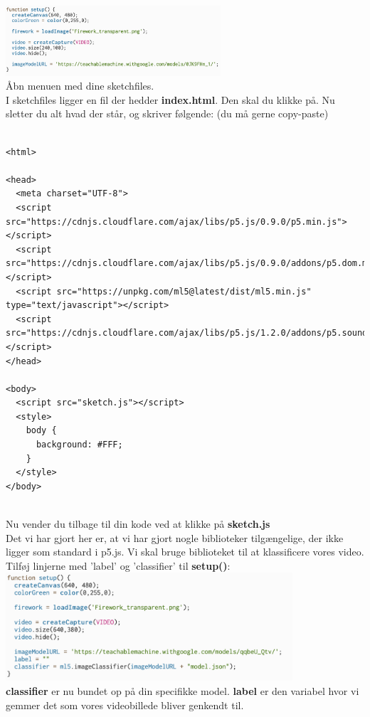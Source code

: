 \documentclass{ucph-handout}
\begin{document}
\newpage
\begin{exercisebox}

\includegraphics[width=0.6\textwidth]{nyebilleder/setupmodel.png}\\

Åbn menuen med dine sketchfiles.\\

I sketchfiles ligger en fil der hedder \textbf{index.html}. Den skal du klikke på. Nu sletter du alt hvad der står, og skriver følgende: (du må gerne copy-paste)

\begin{Verbatim}[fontsize=\tiny]

<html>

<head>
  <meta charset="UTF-8">
  <script src="https://cdnjs.cloudflare.com/ajax/libs/p5.js/0.9.0/p5.min.js"></script>
  <script src="https://cdnjs.cloudflare.com/ajax/libs/p5.js/0.9.0/addons/p5.dom.min.js"></script>
  <script src="https://unpkg.com/ml5@latest/dist/ml5.min.js" type="text/javascript"></script>
  <script src="https://cdnjs.cloudflare.com/ajax/libs/p5.js/1.2.0/addons/p5.sound.min.js"></script>
</head>

<body>
  <script src="sketch.js"></script>
  <style>
    body {
      background: #FFF;
    }
  </style>
</body>
    
\end{Verbatim}

Nu vender du tilbage til din kode ved at klikke på \textbf{sketch.js} \\ Det vi har gjort her er, at vi har gjort nogle biblioteker tilgængelige, der ikke ligger som standard i p5.js. Vi skal bruge biblioteket til at klassificere vores video. \\
Tilføj linjerne med 'label' og 'classifier' til \textbf{setup()}:\\

\includegraphics[width=0.8\textwidth]{nyebilleder/withclassifier.png} \\

\textbf{classifier} er nu bundet op på din specifikke model. \textbf{label} er den variabel hvor vi gemmer det som vores videobillede bliver genkendt til. 

\end{exercisebox}
\end{document}
